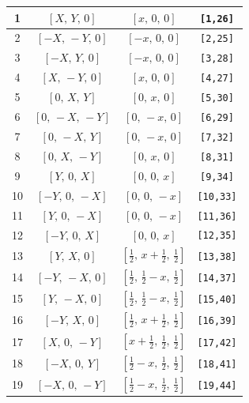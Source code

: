 \documentclass[fleqn,8pt]{jsarticle}
\begin{document}
\begin{longtable}{cccc}
1 & $\left[ X,\, Y,\, 0 \right]$ & $\left[ x,\, 0,\, 0 \right]$ & {\tt [1,26]} \\ \hline
2 & $\left[ - X,\, - Y,\, 0 \right]$ & $\left[ - x,\, 0,\, 0 \right]$ & {\tt [2,25]} \\ \hline
3 & $\left[ - X,\, Y,\, 0 \right]$ & $\left[ - x,\, 0,\, 0 \right]$ & {\tt [3,28]} \\ \hline
4 & $\left[ X,\, - Y,\, 0 \right]$ & $\left[ x,\, 0,\, 0 \right]$ & {\tt [4,27]} \\ \hline
5 & $\left[ 0,\, X,\, Y \right]$ & $\left[ 0,\, x,\, 0 \right]$ & {\tt [5,30]} \\ \hline
6 & $\left[ 0,\, - X,\, - Y \right]$ & $\left[ 0,\, - x,\, 0 \right]$ & {\tt [6,29]} \\ \hline
7 & $\left[ 0,\, - X,\, Y \right]$ & $\left[ 0,\, - x,\, 0 \right]$ & {\tt [7,32]} \\ \hline
8 & $\left[ 0,\, X,\, - Y \right]$ & $\left[ 0,\, x,\, 0 \right]$ & {\tt [8,31]} \\ \hline
9 & $\left[ Y,\, 0,\, X \right]$ & $\left[ 0,\, 0,\, x \right]$ & {\tt [9,34]} \\ \hline
10 & $\left[ - Y,\, 0,\, - X \right]$ & $\left[ 0,\, 0,\, - x \right]$ & {\tt [10,33]} \\ \hline
11 & $\left[ Y,\, 0,\, - X \right]$ & $\left[ 0,\, 0,\, - x \right]$ & {\tt [11,36]} \\ \hline
12 & $\left[ - Y,\, 0,\, X \right]$ & $\left[ 0,\, 0,\, x \right]$ & {\tt [12,35]} \\ \hline
13 & $\left[ Y,\, X,\, 0 \right]$ & $\left[ \frac{1}{2},\, x + \frac{1}{2},\, \frac{1}{2} \right]$ & {\tt [13,38]} \\ \hline
14 & $\left[ - Y,\, - X,\, 0 \right]$ & $\left[ \frac{1}{2},\, \frac{1}{2} - x,\, \frac{1}{2} \right]$ & {\tt [14,37]} \\ \hline
15 & $\left[ Y,\, - X,\, 0 \right]$ & $\left[ \frac{1}{2},\, \frac{1}{2} - x,\, \frac{1}{2} \right]$ & {\tt [15,40]} \\ \hline
16 & $\left[ - Y,\, X,\, 0 \right]$ & $\left[ \frac{1}{2},\, x + \frac{1}{2},\, \frac{1}{2} \right]$ & {\tt [16,39]} \\ \hline
17 & $\left[ X,\, 0,\, - Y \right]$ & $\left[ x + \frac{1}{2},\, \frac{1}{2},\, \frac{1}{2} \right]$ & {\tt [17,42]} \\ \hline
18 & $\left[ - X,\, 0,\, Y \right]$ & $\left[ \frac{1}{2} - x,\, \frac{1}{2},\, \frac{1}{2} \right]$ & {\tt [18,41]} \\ \hline
19 & $\left[ - X,\, 0,\, - Y \right]$ & $\left[ \frac{1}{2} - x,\, \frac{1}{2},\, \frac{1}{2} \right]$ & {\tt [19,44]} \\ \hline

\end{longtable}
\end{document}
